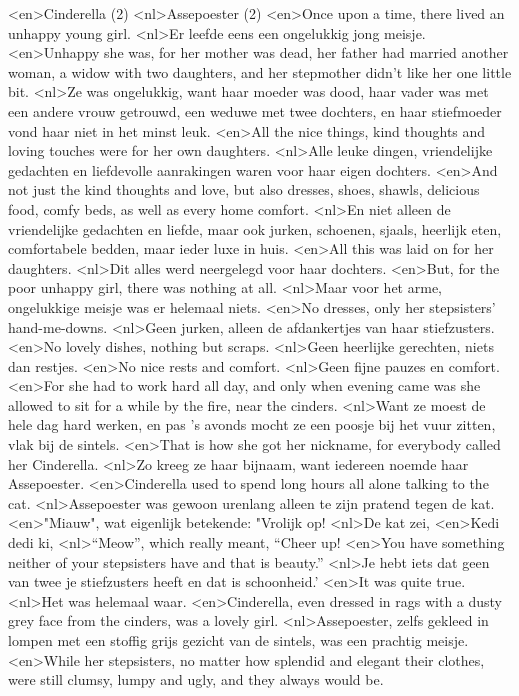 <en>Cinderella (2)
<nl>Assepoester (2)
<en>Once upon a time, there lived an unhappy young girl.
<nl>Er leefde eens een ongelukkig jong meisje.
<en>Unhappy she was, for her mother was dead, her father had married another woman, a widow with two daughters, and her stepmother didn’t like her one little bit.
<nl>Ze was ongelukkig, want haar moeder was dood, haar vader was met een andere vrouw getrouwd, een weduwe met twee dochters, en haar stiefmoeder vond haar niet in het minst leuk.
<en>All the nice things, kind thoughts and loving touches were for her own daughters.
<nl>Alle leuke dingen, vriendelijke gedachten en liefdevolle aanrakingen waren voor haar eigen dochters.
<en>And not just the kind thoughts and love, but also dresses, shoes, shawls, delicious food, comfy beds, as well as every home comfort.
<nl>En niet alleen de vriendelijke gedachten en liefde, maar ook jurken, schoenen, sjaals, heerlijk eten, comfortabele bedden, maar ieder luxe in huis.
<en>All this was laid on for her daughters.
<nl>Dit alles werd neergelegd voor haar dochters.
<en>But, for the poor unhappy girl, there was nothing at all.
<nl>Maar voor het arme, ongelukkige meisje was er helemaal niets.
<en>No dresses, only her stepsisters’ hand-me-downs.
<nl>Geen jurken, alleen de afdankertjes van haar stiefzusters.
<en>No lovely dishes, nothing but scraps.
<nl>Geen heerlijke gerechten, niets dan restjes.
<en>No nice rests and comfort.
<nl>Geen fijne pauzes en comfort.
<en>For she had to work hard all day, and only when evening came was she allowed to sit for a while by the fire, near the cinders.
<nl>Want ze moest de hele dag hard werken, en pas 's avonds mocht ze een poosje bij het vuur zitten, vlak bij de sintels.
<en>That is how she got her nickname, for everybody called her Cinderella.
<nl>Zo kreeg ze haar bijnaam, want iedereen noemde haar Assepoester.
<en>Cinderella used to spend long hours all alone talking to the cat.
<nl>Assepoester was gewoon urenlang alleen te zijn  pratend tegen de kat.
<en>"Miauw", wat eigenlijk betekende: "Vrolijk op!
<nl>De kat zei,
<en>Kedi dedi ki,
<nl>“Meow”, which really meant, “Cheer up!
<en>You have something neither of your stepsisters have and that is beauty.”
<nl>Je hebt iets dat geen van twee je stiefzusters heeft en dat is schoonheid.'
<en>It was quite true.
<nl>Het was helemaal waar.
<en>Cinderella, even dressed in rags with a dusty grey face from the cinders, was a lovely girl.
<nl>Assepoester, zelfs gekleed in lompen met een stoffig grijs gezicht van de sintels, was een prachtig meisje.
<en>While her stepsisters, no matter how splendid and elegant their clothes, were still clumsy, lumpy and ugly, and they always would be.
